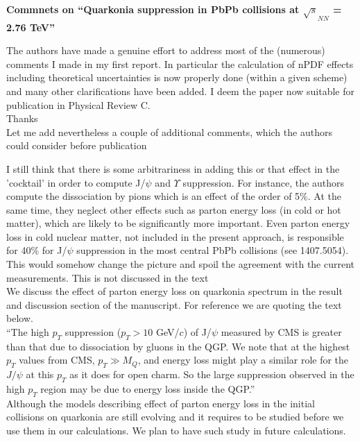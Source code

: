 \documentclass[aps,prc,preprint,superscriptaddress,showpacs,showkeys]{revtex4-1}
\begin{document}
{\Large \bf Commnets on ``Quarkonia suppression in PbPb collisions at $\sqrt s_{NN}$ =  2.76 TeV''}

\bigskip
\bigskip
\bigskip
\bigskip
{\color{red}
The authors have made a genuine effort to address most of the
(numerous) comments I made in my first report. In particular the
calculation of nPDF effects including theoretical uncertainties is now
properly done (within a given scheme) and many other clarifications
have been added. I deem the paper now suitable for publication in
Physical Review C.} \\

{ \color{black} Thanks }\\

{\color{red}
Let me add nevertheless a couple of additional comments, which the
authors could consider before publication} \\

\bigskip
\bigskip

{\color{red}
 I still think that there is some arbitrariness in adding this or
that effect in the 'cocktail' in order to compute J/$\psi$ and $\Upsilon$
suppression. For instance, the authors compute the dissociation by
pions which is an effect of the order of 5$\%$. At the same time, they
neglect other effects such as parton energy loss (in cold or hot
matter), which are likely to be significantly more important. Even
parton energy loss in cold nuclear matter, not included in the present
approach, is responsible for 40$\%$ for J/$\psi$ suppression in the most
central PbPb collisions (see 1407.5054). This would somehow change the
picture and spoil the agreement with the current measurements. This is
not discussed in the text}\\

{ \color{black}
  We discuss the effect of parton energy loss on quarkonia spectrum in the
result and discussion section of the manuscript. For reference we are quoting
the text below.\\ 
{ \color{blue}``The high $p_T$ suppression ($p_T > 10$  GeV/$c$) of J/$\psi$ 
measured by CMS is greater than that due to dissociation by gluons in the QGP. We note 
that at the highest $p_T$ values from CMS, $p_T \gg M_Q$, and energy loss might play a 
similar role for the $J/\psi$ at this $p_T$ as it does for open charm. So the 
large suppression observed in the high $p_T$ region may be due to energy loss inside the QGP.''}\\
Although the models describing effect of parton energy loss in the initial collisions 
on quarkonia are still evolving and it requires to be studied before we use them in our 
calculations. We plan to have such study in future calculations.     
}\\
\end{document}
